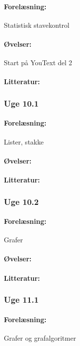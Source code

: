 \documentclass[12pt]{article}
\begin{document}
\paragraph{Forelæsning:} 
Statistisk stavekontrol
\paragraph{Øvelser:}
Start på YouText del 2
\paragraph{Litteratur:}

\subsubsection{Uge 10.1}
\paragraph{Forelæsning:} 
Lister, stakke
\paragraph{Øvelser:}
\paragraph{Litteratur:}

\subsubsection{Uge 10.2}
\paragraph{Forelæsning:} 
Grafer 
\paragraph{Øvelser:}
\paragraph{Litteratur:}

\subsubsection{Uge 11.1}
\paragraph{Forelæsning:} 
Grafer og grafalgoritmer
\end{document}
